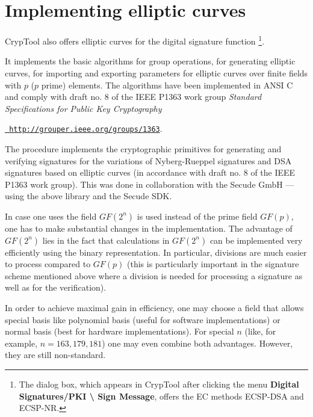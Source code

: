 \section{Implementing elliptic curves}

CrypTool also offers elliptic curves for the digital signature function%
\footnote{%
The dialog box, which appears in CrypTool after clicking the menu
{\bf Digital Signatures/PKI \textbackslash{} Sign Message},
offers the EC methods ECSP-DSA and ECSP-NR.
}.

It implements the basic algorithms for group operations, for generating elliptic
curves, for importing and exporting parameters for elliptic curves over finite
fields with $p$ ($p$ prime) elements. The algorithms have been implemented in
ANSI C and comply with draft no. 8 of the IEEE P1363 work group {\em Standard
Specifications for Public Key Cryptography}

{\href{http://grouper.ieee.org/groups/1363}{\tt
http://grouper.ieee.org/groups/1363}}.

The procedure implements the cryptographic primitives for generating and
verifying signatures for the variations of Nyberg-Rueppel signatures and
 DSA signatures based on elliptic curves (in accordance with draft
no. 8 of the IEEE P1363 work group). This was done in collaboration with the
Secude GmbH --- using the above library and the Secude SDK.

In case one uses the field $GF(2^n)$ is used instead of the prime field $GF(p)$, one has to make substantial changes in the implementation. The advantage of $GF(2^n)$ lies in the fact that calculations in $GF(2^n)$ can be implemented very efficiently using the binary representation. In particular, divisions are much easier to process compared to $GF(p)$ (this is particularly important in the signature scheme mentioned above where a division is needed for processing a signature as well as for the verification).

In order to achieve maximal gain in efficiency, one may choose a field that allows special basis like polynomial basis (useful for software implementations) or normal basis (best for hardware implementations). For special $n$ (like, for example, $n=163,179,181$) one may even combine both advantages. However, they are still non-standard.

